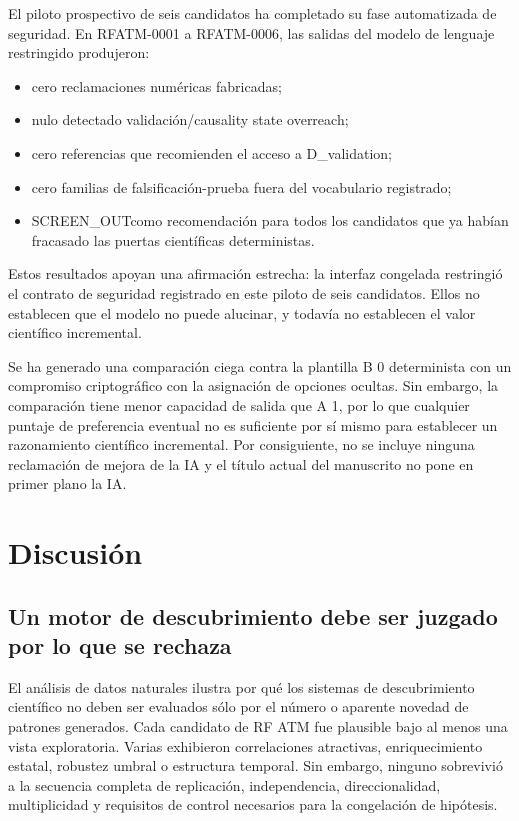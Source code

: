 \documentclass{ieeeaccess}
\providecommand{\tightlist}{\setlength{\itemsep}{0pt}\setlength{\parskip}{0pt}}
\begin{document}
El piloto prospectivo de seis candidatos ha completado su fase automatizada de seguridad. En RFATM-0001 a RFATM-0006, las salidas del modelo de lenguaje restringido produjeron:

\begin{itemize}
\tightlist
\item
  cero reclamaciones numéricas fabricadas;
\item
  nulo detectado validación/causality state overreach;
\item
  cero referencias que recomienden el acceso a D\_validation;
\item
  cero familias de falsificación-prueba fuera del vocabulario registrado;
\item
  SCREEN\_OUTcomo recomendación para todos los candidatos que ya habían fracasado las puertas científicas deterministas.
\end{itemize}

Estos resultados apoyan una afirmación estrecha: la interfaz congelada restringió el contrato de seguridad registrado en este piloto de seis candidatos. Ellos no establecen que el modelo no puede alucinar, y todavía no establecen el valor científico incremental.

Se ha generado una comparación ciega contra la plantilla B 0 determinista con un compromiso criptográfico con la asignación de opciones ocultas. Sin embargo, la comparación tiene menor capacidad de salida que A 1, por lo que cualquier puntaje de preferencia eventual no es suficiente por sí mismo para establecer un razonamiento científico incremental. Por consiguiente, no se incluye ninguna reclamación de mejora de la IA y el título actual del manuscrito no pone en primer plano la IA.

\section{Discusión}\label{discusiuxf3n}

\subsection{Un motor de descubrimiento debe ser juzgado por lo que se rechaza}\label{un-motor-de-descubrimiento-debe-ser-juzgado-por-lo-que-se-rechaza}

El análisis de datos naturales ilustra por qué los sistemas de descubrimiento científico no deben ser evaluados sólo por el número o aparente novedad de patrones generados. Cada candidato de RF ATM fue plausible bajo al menos una vista exploratoria. Varias exhibieron correlaciones atractivas, enriquecimiento estatal, robustez umbral o estructura temporal. Sin embargo, ninguno sobrevivió a la secuencia completa de replicación, independencia, direccionalidad, multiplicidad y requisitos de control necesarios para la congelación de hipótesis.
\end{document}
